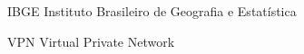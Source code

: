 \begin{siglas}
  \item[IBGE] Instituto Brasileiro de Geografia e Estatística
  \item[VPN] Virtual Private Network
\end{siglas}
